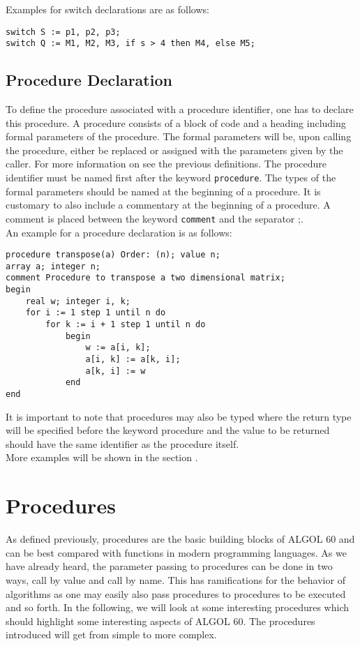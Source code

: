 \documentclass{article}
\begin{document}
Examples for switch declarations are as follows:\\ 
\begin{lstlisting}[language={[60]algol}]
switch S := p1, p2, p3;
switch Q := M1, M2, M3, if s > 4 then M4, else M5;
\end{lstlisting}

\subsection{Procedure Declaration} \label{procDecl}
To define the procedure associated with a procedure identifier, one has to declare this procedure. A procedure consists of a block of code and a heading including formal parameters of the procedure. The formal parameters will be, upon calling the procedure, either be replaced or assigned with the parameters given by the caller. For more information on  see the previous definitions. The procedure identifier must be named first after the keyword \texttt{procedure}. The types of the formal parameters should be named at the beginning of a procedure. It is customary to also include a commentary at the beginning of a procedure. A comment is placed between the keyword \texttt{comment} and the separator ;.\\

An example for a procedure declaration is as follows:\\ 
\begin{lstlisting}[language={[60]algol}]
procedure transpose(a) Order: (n); value n;
array a; integer n;
comment Procedure to transpose a two dimensional matrix;
begin
    real w; integer i, k;
    for i := 1 step 1 until n do
        for k := i + 1 step 1 until n do
            begin
                w := a[i, k];
                a[i, k] := a[k, i];
                a[k, i] := w
            end
end
\end{lstlisting}

It is important to note that procedures may also be typed where the return type will be specified before the keyword procedure and the value to be returned should have the same identifier as the procedure itself.\\

More examples will be shown in the section .

\newpage

\section{Procedures} \label{procedures}
As defined previously, procedures are the basic building blocks of ALGOL 60 and can be best compared with functions in modern programming languages. As we have already heard, the parameter passing to procedures can be done in two ways, call by value and call by name. This has ramifications for the behavior of algorithms as one may easily also pass procedures to procedures to be executed and so forth. In the following, we will look at some interesting procedures which should highlight some interesting aspects of ALGOL 60. The procedures introduced will get from simple to more complex. \\
\end{document}
